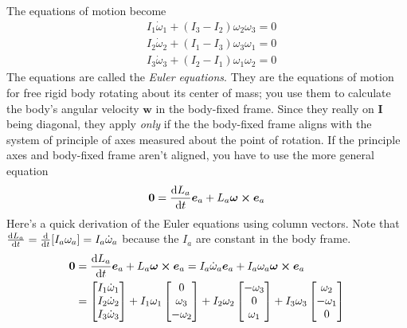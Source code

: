 \documentclass[11pt, a4paper]{article}
\newcommand{\e}{\bm{e}} %
\newcommand{\mat}[1]{\mathbf{#1}}
\begin{document}
\begin{itemize}
	 The equations of motion become
	\begin{align*}
		&I_{1}{\dot  {\omega }}_{{1}} + (I_{3}-I_{2}) \omega_{2} \omega_{3} = 0\\
		&I_{2}{\dot  {\omega}}_{{2}} + (I_{1}-I_{3}) \omega_{3} \omega_{1} = 0\\
		&I_{3}{\dot  {\omega }}_{{3}} + (I_{2}-I_{1}) \omega _{1} \omega_{2} = 0
	\end{align*}
	The equations are called the \textit{Euler equations}. They are the equations of motion for free rigid body rotating about its center of mass; you use them to calculate the body's angular velocity $ \bm{w} $ in the body-fixed frame. Since they really on $ \mat{I} $ being diagonal, they apply \textit{only} if the the body-fixed frame aligns with the system of principle of axes measured about the point of rotation. If the principle axes and body-fixed frame aren't aligned, you have to use the more general equation
	\begin{equation*}
		\bm{0} = \dv{{L}_{a}}{t} \e_{a} + L_{a}\bm{\omega} \cross \e_{a}
	\end{equation*}
	Here's a quick derivation of the Euler equations using column vectors. Note that $ \dv{L_{a}}{t} = \dv{}{t}[I_{a}\omega_{a}] = I_{a}\dot{\omega}_{a} $ because the $ I_{a} $ are constant in the body frame.
	\begin{align*}
		\bm{0} & = \dv{{L}_{a}}{t} \e_{a} + L_{a}\bm{\omega} \cross \e_{a} = I_{a}\dot{\omega}_{a} \e_{a} + I_{a}\omega_{a} \bm{\omega}\cross \bm{e}_{a}\\
		&=\begin{bmatrix}
			I_{1}\dot{\omega}_{1}\\
			I_{2}\dot{\omega}_{2}\\
			I_{3}\dot{\omega}_{3}
		\end{bmatrix} + I_{1}\omega_{1} 
		\begin{bmatrix}
			0\\
			\omega_{3}\\
			-\omega_{2}
		\end{bmatrix} + I_{2}\omega_{2} 
		\begin{bmatrix}
			-\omega_{3}\\
			0\\
			\omega_{1}
		\end{bmatrix} + I_{3}\omega_{3} 
		\begin{bmatrix}
			\omega_{2}\\
			-\omega_{1}\\
			0
		\end{bmatrix}\\

\end{align*}
\end{itemize}
\end{document}
